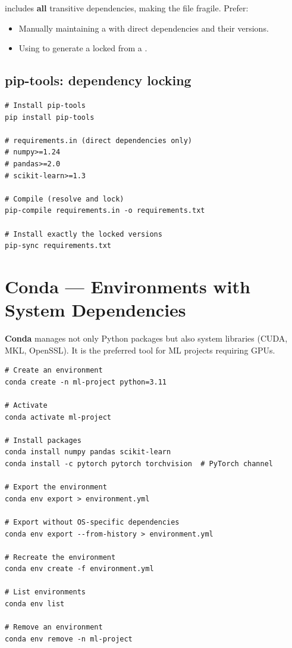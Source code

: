 \begin{warning}[title=\textbf{pip freeze pitfalls}]
 includes \textbf{all} transitive dependencies, making the
file fragile. Prefer:
\begin{itemize}
  \item Manually maintaining a  with direct
    dependencies and their versions.
  \item Using  to generate a locked 
    from a .
\end{itemize}
\end{warning}

\subsection{pip-tools: dependency locking}

\begin{codeblock}[title=\textbf{pip-tools workflow}]
\begin{verbatim}
# Install pip-tools
pip install pip-tools

# requirements.in (direct dependencies only)
# numpy>=1.24
# pandas>=2.0
# scikit-learn>=1.3

# Compile (resolve and lock)
pip-compile requirements.in -o requirements.txt

# Install exactly the locked versions
pip-sync requirements.txt
\end{verbatim}
\end{codeblock}

\section{Conda --- Environments with System Dependencies}
\label{sec:conda}

\textbf{Conda} manages not only Python packages but also
system libraries (CUDA, MKL, OpenSSL). It is the preferred tool for ML
projects requiring GPUs.

\begin{codeblock}[title=\textbf{Essential Conda commands}]
\begin{verbatim}
# Create an environment
conda create -n ml-project python=3.11

# Activate
conda activate ml-project

# Install packages
conda install numpy pandas scikit-learn
conda install -c pytorch pytorch torchvision  # PyTorch channel

# Export the environment
conda env export > environment.yml

# Export without OS-specific dependencies
conda env export --from-history > environment.yml

# Recreate the environment
conda env create -f environment.yml

# List environments
conda env list

# Remove an environment
conda env remove -n ml-project
\end{verbatim}
\end{codeblock}

